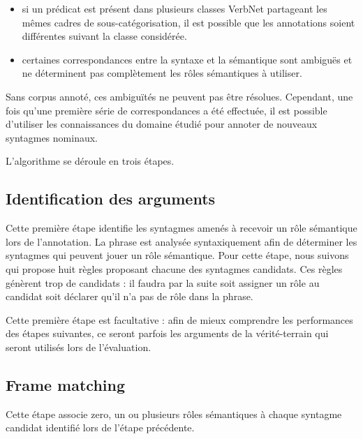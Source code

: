 \begin{itemize}

    \item si un prédicat est présent dans plusieurs classes VerbNet partageant
    les mêmes cadres de sous-catégorisation, il est possible que les annotations
    soient différentes suivant la classe considérée.

    \item certaines correspondances entre la syntaxe et la sémantique sont
    ambiguës et ne déterminent pas complètement les rôles sémantiques à utiliser.

\end{itemize}

Sans corpus annoté, ces ambiguïtés ne peuvent pas être résolues. Cependant, une
fois qu'une première série de correspondances a été effectuée, il est possible
d'utiliser les connaissances du domaine étudié pour annoter de nouveaux
syntagmes nominaux.

L'algorithme se déroule en trois étapes.

\subsection{Identification des arguments}


Cette première étape identifie les syntagmes amenés à recevoir un rôle
sémantique lors de l'annotation. La phrase est analysée syntaxiquement afin de
déterminer les syntagmes qui peuvent jouer un rôle sémantique. Pour cette
étape, nous suivons \cite{lang2011unsupervised} qui propose huit règles
proposant chacune des syntagmes candidats. Ces règles génèrent trop de
candidats : il faudra par la suite soit assigner un rôle au candidat soit
déclarer qu'il n'a pas de rôle dans la phrase.


Cette première étape est facultative : afin de mieux comprendre les
performances des étapes suivantes, ce seront parfois les arguments de la
vérité-terrain qui seront utilisés lors de l'évaluation.

\subsection{Frame matching}

Cette étape associe zero, un ou plusieurs rôles sémantiques à chaque syntagme
candidat identifié lors de l'étape précédente.

